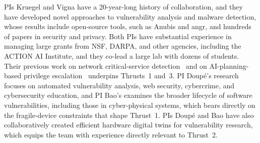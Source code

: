 PIs Kruegel and Vigna have a 20-year-long history of collaboration, and they
have developed novel approaches to vulnerability analysis and malware
detection, whose results include open-source tools, such as Anubis and angr,
and hundreds of papers in security and privacy. Both PIs have substantial
experience in managing large grants from NSF, DARPA, and other agencies,
including the ACTION AI Institute, and they co-lead a large lab with dozens
of students. Their previous work on network critical-service
detection~\cite{achilles} and on AI-planning-based privilege
escalation~\cite{chainreactor} underpins Thrusts~1 and~3. PI Doup\'e's
research focuses on automated vulnerability analysis, web security,
cybercrime, and cybersecurity education, and PI Bao's examines the broader
lifecycle of software vulnerabilities, including those in cyber-physical
systems, which bears directly on the fragile-device constraints that shape
Thrust~1. PIs Doup\'e and Bao have also collaboratively created efficient hardware
digital twins for vulnerability research, which equips the team with
experience directly relevant to Thrust~2.
